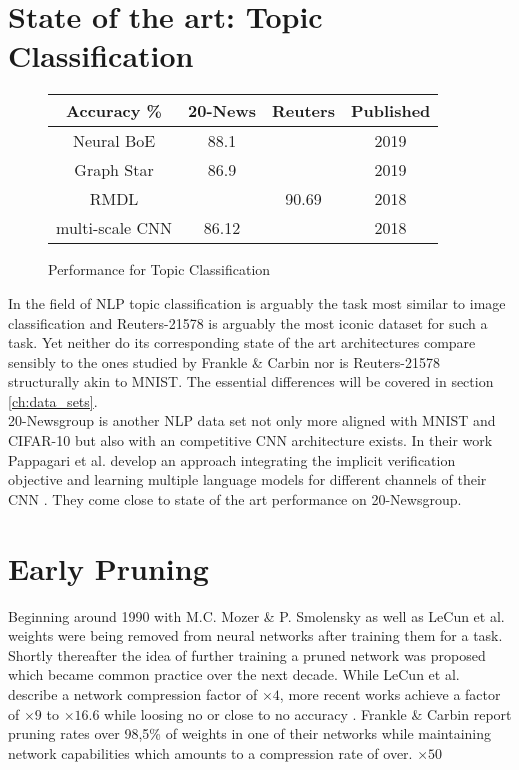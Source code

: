\section{State of the art: Topic Classification}
\begin{figure}
	\begin{tabular}{c|c|c|c}
		Accuracy \% & 20-News & Reuters & Published\\
		\hline
		Neural BoE & 88.1 &  & 2019 \\
		Graph Star & 86.9 &  & 2019 \\
		RMDL &  & 90.69 & 2018 \\
		\hline
		multi-scale CNN & 86.12 &  & 2018 \\
		
	\end{tabular}
	\caption{Performance for Topic Classification}
\end{figure}
In the field of NLP topic classification is arguably the task most similar to image classification and Reuters-21578 is arguably the most iconic dataset for such a task. Yet neither do its corresponding state of the art architectures compare sensibly to the ones studied by Frankle \& Carbin nor is Reuters-21578 structurally akin to MNIST. The essential differences will be covered in section \ref{ch:data_sets}. \\
20-Newsgroup is another NLP data set not only more aligned with MNIST and CIFAR-10 but also with an competitive CNN architecture exists. In their work Pappagari et al. develop an approach integrating the implicit verification objective and learning multiple language models for different channels of their CNN \cite{End-to-End-CNN}. They come close to state of the art performance on 20-Newsgroup. 

\section{Early Pruning}
Beginning around 1990 with M.C. Mozer \& P. Smolensky \cite{Skeletonization} as well as LeCun et al. \cite{Optimal-Brain-Damage} weights were being removed from neural networks after training them for a task. Shortly thereafter the idea of further training a pruned network was proposed \cite{Optimal-Brain-Surgeon} which became common practice over the next decade. While LeCun et al. describe a network compression factor of $\times4$, more recent works achieve a factor of $\times9$ to $\times16.6$ while loosing no or close to no accuracy \cite{Learning_Weights_And_Connections} \cite{ThiNet}. Frankle \& Carbin report pruning rates over 98,5\% of weights in one of their networks while maintaining network capabilities which amounts to a compression rate of over. \cite{LTH} $\times50$

